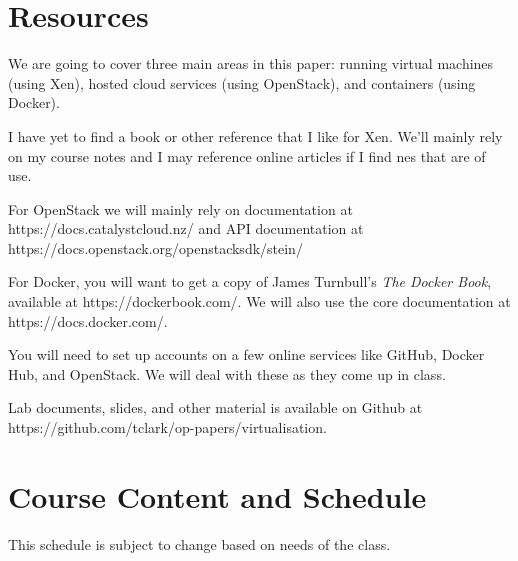 \documentclass{article}
\begin{document}
\section*{Resources}
We are going to cover three main areas in this paper: running virtual machines (using Xen), hosted cloud services (using OpenStack), and containers (using Docker).

I have yet to find a book or other reference that I like for Xen. We'll mainly rely on my course notes and I may reference online articles if I find nes that are of use.

For OpenStack we will mainly rely on documentation at https://docs.catalystcloud.nz/ and API documentation at https://docs.openstack.org/openstacksdk/stein/

For Docker, you will want to get a copy of James Turnbull's \emph{The Docker Book}, available at https://dockerbook.com/. We will also use the core documentation at https://docs.docker.com/.


You will need to set up accounts on a few online services like GitHub, Docker Hub, and OpenStack.  We will deal with these as they come up in class.

Lab documents, slides, and other material is available on Github at https://github.com/tclark/op-papers/virtualisation.

\newpage 

\section*{Course Content and Schedule}
This schedule is subject to change based on needs of the class.
\end{document}
